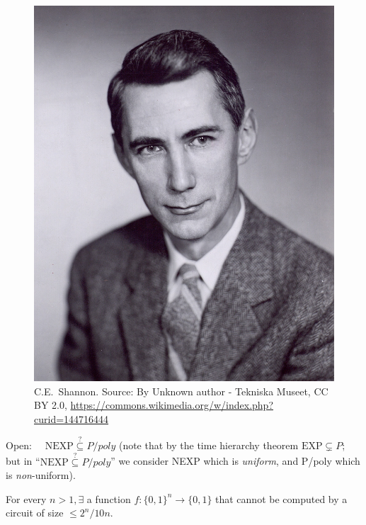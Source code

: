 \begin{figure}
    \centering
    \includegraphics[width=0.25\linewidth]{images/C.E._Shannon._Tekniska_museet_43069(1).jpg}
    \caption{C.E.~Shannon. Source: By Unknown author - Tekniska Museet, CC BY 2.0, \url{https://commons.wikimedia.org/w/index.php?curid=144716444}}
    \label{Claude Shannon}
\end{figure}






Open: $\quad \mathrm{NEXP}\stackrel{?}{\subseteq}P/poly$ (note that by the time hierarchy theorem $\mathrm{EXP}\subsetneq P$; but in ``$\mathrm{NEXP}\stackrel{?}{\subseteq}P/poly$'' we consider NEXP which is \emph{uniform}, and P/poly which is \textit{non}-uniform).


\begin{theorem}
    For every $n>1, \exists$ a function $f:\{0,1\}^n \rightarrow\{0,1\}$ that cannot be computed by a circuit of size  $\le 2^n / 10 n$.
\end{theorem}


